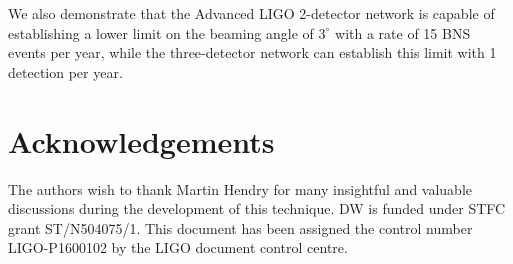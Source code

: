 \documentclass[twocolumn,nofootinbib]{revtex4-1}
\newcommand{\grbrate}{{{\mathcal R}_{\mathrm{grb}}}}
\newcommand{\cbcrate}{{{\mathcal R}}}
\newcommand{\diff}{{\mathrm d}}
\begin{document}
We also demonstrate that the Advanced LIGO 2-detector network is
capable of establishing a lower limit on the beaming angle of
$3^{\circ}$ with a rate of 15 BNS events per year, while the
three-detector network can establish this limit with 1 detection per
year.

\section{Acknowledgements}
\label{sec:ackn}
The authors wish to thank Martin Hendry for many insightful and
valuable discussions during the development of this technique. DW is
funded under STFC grant ST/N504075/1. This document has been assigned the
control number LIGO-P1600102 by the LIGO document control centre.

\end{document}
